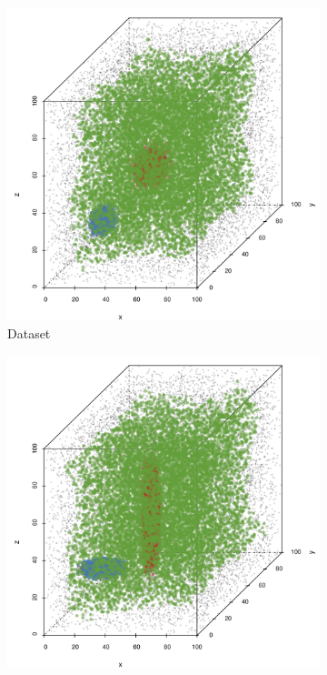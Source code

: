 		\begin{figure}
			\centering
			\begin{subfigure}{0.23\textwidth}
				\centering
				\includegraphics[keepaspectratio=true, width=\textwidth, height=0.23\textheight]{discussion/img/ferdosi_2_abs_error_mbeSmallerThansambe}
				\caption{Dataset \ferdosiTwo}
				\label{fig:discussion:performance:mbeLowerError:ferdosi2}
			\end{subfigure}
			\begin{subfigure}{0.23\textwidth}
				\centering
				\includegraphics[keepaspectratio=true, width=\textwidth, height=0.23\textheight]{discussion/img/baakman_2_abs_error_mbeSmallerThansambe}

\end{subfigure}
\end{figure}
